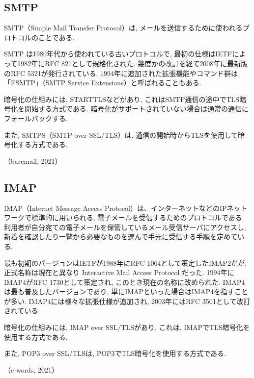 \documentclass{ltjsarticle} %
\begin{document}
\subsection{SMTP}
SMTP（Simple Mail Transfer Protocol）は, メールを送信するために使われるプロトコルのことである. 

\vspace{0.5cm}

SMTP は1980年代から使われている古いプロトコルで, 最初の仕様はIETFによって1982年にRFC 821として規格化された. 
幾度かの改訂を経て2008年に最新版のRFC 5321が発行されている. 
1994年に追加された拡張機能やコマンド群は「ESMTP」（SMTP Service Extensions）と呼ばれることもある. 

\vspace{0.5cm}

暗号化の仕組みには, STARTTLSなどがあり, これはSMTP通信の途中でTLS暗号化を開始する方式である. 
暗号化がサポートされていない場合は通常の通信にフォールバックする. 

また, SMTPS（SMTP over SSL/TLS）は, 通信の開始時からTLSを使用して暗号化する方式である. 

（baremail, 2021）

\subsection{IMAP}
IMAP（Internet Message Access Protocol）は、インターネットなどのIPネットワークで標準的に用いられる, 
電子メールを受信するためのプロトコルである. 
利用者が自分宛ての電子メールを保管しているメール受信サーバにアクセスし, 新着を確認したり一覧から必要なものを選んで手元に受信する手順を定めている. 

\vspace{0.5cm}

最も初期のバージョンはIETFが1988年にRFC 1064として策定したIMAP2だが, 正式名称は現在と異なり Interactive Mail Access Protocol だった. 
1994年にIMAP4がRFC 1730として策定され, このとき現在の名称に改められた. 
IMAP4は最も普及したバージョンであり, 単にIMAPといった場合はIMAP4を指すことが多い. 
IMAP4には様々な拡張仕様が追加され, 2003年にはRFC 3501として改訂されている. 

\vspace{0.5cm}

暗号化の仕組みには, IMAP over SSL/TLSがあり, これは, IMAPでTLS暗号化を使用する方式である. 

また, POP3 over SSL/TLSは, POP3でTLS暗号化を使用する方式である. 

（e-words, 2021）
\end{document}
